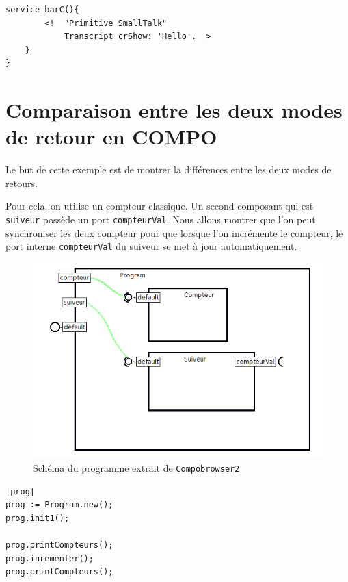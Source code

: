 \documentclass[11pt,a4paper,openany,oneside]{book}
\begin{document}
\begin{appendices}
\begin{lstlisting}[language=Compo, frame=single, caption=Programme C]
	service barC(){
		<!	"Primitive SmallTalk"
		    Transcript crShow: 'Hello'.	 > 
	}
}
\end{lstlisting}




\chapter{Comparaison entre les deux modes de retour en COMPO}
\label{annexeretourcomparaison}

Le but de cette exemple est de montrer la différences entre les deux modes de retours.

Pour cela, on utilise un compteur classique. Un second composant qui est \texttt{suiveur} possède un port \texttt{compteurVal}. Nous allons montrer que l'on peut synchroniser les deux compteur pour que lorsque l'on incrémente le compteur, le port interne \texttt{compteurVal} du suiveur se met à jour automatiquement.

\begin{figure}[H]
\centering
\includegraphics[scale=0.7, keepaspectratio=true]{CompteurSuiveur}
\caption{Schéma du programme extrait de \texttt{Compobrowser2}}
\label{compteursuiveur}
\end{figure}

\clearpage

\begin{lstlisting}[language=Compo, frame=single, caption=Workspace (Retour classique)]
|prog|
prog := Program.new();
prog.init1();

prog.printCompteurs();
prog.inrementer();
prog.printCompteurs();
\end{lstlisting}



\end{appendices}
\end{document}

